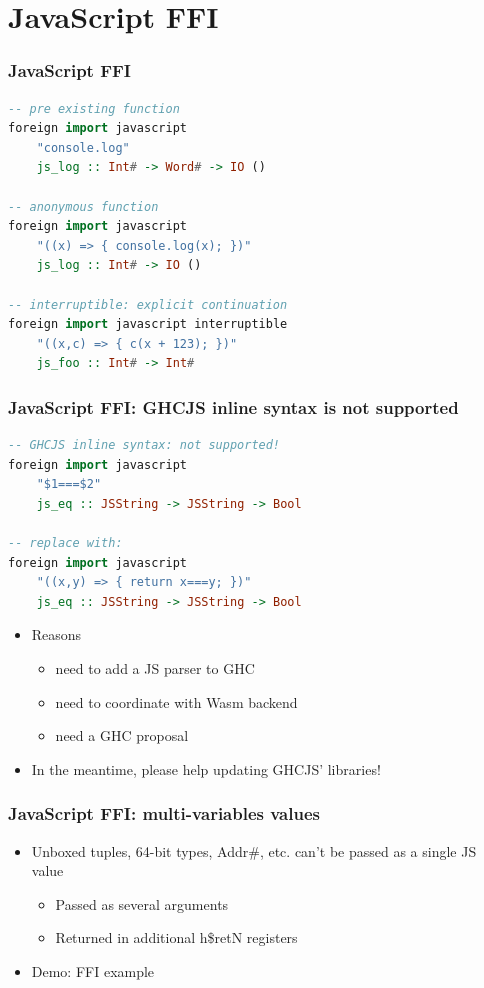 \documentclass{beamer}
\begin{document}
\section{JavaScript FFI}

\begin{frame}[fragile]
\frametitle{JavaScript FFI}

\begin{lstlisting}[language=haskell]
-- pre existing function
foreign import javascript
    "console.log"
    js_log :: Int# -> Word# -> IO ()

-- anonymous function
foreign import javascript
    "((x) => { console.log(x); })"
    js_log :: Int# -> IO ()

-- interruptible: explicit continuation
foreign import javascript interruptible
    "((x,c) => { c(x + 123); })"
    js_foo :: Int# -> Int#
\end{lstlisting}

\end{frame}


\begin{frame}[fragile]
\frametitle{JavaScript FFI: GHCJS inline syntax is not supported}

\begin{lstlisting}[language=haskell]
-- GHCJS inline syntax: not supported!
foreign import javascript
    "$1===$2"
    js_eq :: JSString -> JSString -> Bool

-- replace with:
foreign import javascript
    "((x,y) => { return x===y; })"
    js_eq :: JSString -> JSString -> Bool

\end{lstlisting}

  \begin{itemize}
    \item Reasons
      \begin{itemize}
        \item need to add a JS parser to GHC
        \item need to coordinate with Wasm backend
        \item need a GHC proposal
      \end{itemize}
    \item In the meantime, please help updating GHCJS' libraries!
  \end{itemize}

\end{frame}


\begin{frame}[fragile]
  \frametitle{JavaScript FFI: multi-variables values}
  \begin{itemize}
    \item Unboxed tuples, 64-bit types, Addr\#, etc. can’t be passed as a single JS value
      \begin{itemize}
    \item Passed as several arguments
    \item Returned in additional h\$retN registers
      \end{itemize}
    \item Demo: FFI example
  \end{itemize}

\end{frame}
\end{document}
